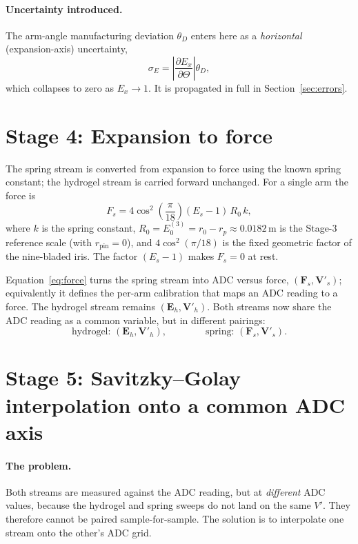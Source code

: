 \documentclass[11pt]{article}
\newcommand{\dset}[1]{\mathbf{#1}}          %
\newcommand{\unc}[1]{\sigma_{#1}}           %
\begin{document}
\paragraph{Uncertainty introduced.}
The arm-angle manufacturing deviation $\theta_D$ enters here as a \emph{horizontal}
(expansion-axis) uncertainty,
\begin{equation}
\unc{E}=\left|\frac{\partial E_x}{\partial \Theta}\right|\theta_D ,
\label{eq:Eunc}
\end{equation}
which collapses to zero as $E_x\!\to\!1$. It is propagated in full in Section~\ref{sec:errors}.

\section{Stage 4: Expansion to force}
\label{sec:force}
The spring stream is converted from expansion to force using the known spring constant; the
hydrogel stream is carried forward unchanged. For a single arm the force is
\begin{equation}
F_s=4\cos^{2}\!\left(\frac{\pi}{18}\right)(E_s-1)\,R_0\,k,
\label{eq:force}
\end{equation}
where $k$ is the spring constant, $R_0=E_0^{(3)}=r_0-r_p\approx 0.0182\,\mathrm{m}$ is the
Stage-3 reference scale (with $r_{\mathrm{pin}}=0$), and $4\cos^2(\pi/18)$ is the fixed
geometric factor of the nine-bladed iris. The factor $(E_s-1)$ makes $F_s=0$ at rest.

Equation~\eqref{eq:force} turns the spring stream into ADC versus force,
$(\dset{F}_s,\dset{V}'_s)$; equivalently it defines the per-arm calibration that maps an ADC
reading to a force. The hydrogel stream remains $(\dset{E}_h,\dset{V}'_h)$. Both streams now
share the ADC reading as a common variable, but in different pairings:
\begin{equation}
\text{hydrogel: } (\dset{E}_h,\dset{V}'_h),
\qquad\qquad
\text{spring: } (\dset{F}_s,\dset{V}'_s).
\end{equation}

\section{Stage 5: Savitzky--Golay interpolation onto a common ADC axis}
\label{sec:sg}
\paragraph{The problem.}
Both streams are measured against the ADC reading, but at \emph{different} ADC values, because
the hydrogel and spring sweeps do not land on the same $V'$. They therefore cannot be paired
sample-for-sample. The solution is to interpolate one stream onto the other's ADC grid.
\end{document}
